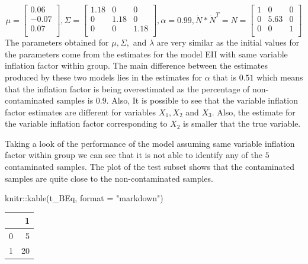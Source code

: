 \documentclass[
]{article}
\newenvironment{Shaded}{\begin{snugshade}}{\end{snugshade}}
\newcommand{\AttributeTok}[1]{\textcolor[rgb]{0.77,0.63,0.00}{#1}}
\newcommand{\FunctionTok}[1]{\textcolor[rgb]{0.00,0.00,0.00}{#1}}
\newcommand{\NormalTok}[1]{#1}
\newcommand{\SpecialCharTok}[1]{\textcolor[rgb]{0.00,0.00,0.00}{#1}}
\newcommand{\StringTok}[1]{\textcolor[rgb]{0.31,0.60,0.02}{#1}}
\begin{document}
\[
\mu = \begin{bmatrix}0.06 \\-0.07 \\0.07 \\\end{bmatrix} , \Sigma = \begin{bmatrix}1.18&0&0 \\0&1.18&0 \\0&0&1.18 \\\end{bmatrix} , \alpha = 0.99, \dot{N} * \dot{N}^{T} = N = \begin{bmatrix}1&0&0 \\0&5.63&0 \\0&0&1 \\\end{bmatrix}
\] The parameters obtained for \(\mu,\Sigma,\) and \(\lambda\) are very
similar as the initial values for the parameters come from the estimates
for the model EII with same variable inflation factor within group. The
main difference between the estimates produced by these two models lies
in the estimates for \(\alpha\) that is \(0.51\) which means that the
inflation factor is being overestimated as the percentage of
non-contaminated samples is \(0.9\). Also, It is possible to see that
the variable inflation factor estimates are different for variables
\(X_{1},X_{2}\) and \(X_{3}\). Also, the estimate for the variable
inflation factor corresponding to \(X_{2}\) is smaller that the true
variable.

Taking a look of the performance of the model assuming same variable
inflation factor within group we can see that it is not able to identify
any of the \(5\) contaminated samples. The plot of the test subset shows
that the contaminated samples are quite close to the non-contaminated
samples.

\begin{Shaded}
\begin{Highlighting}[]
\NormalTok{knitr}\SpecialCharTok{::}\FunctionTok{kable}\NormalTok{(t\_BEq, }\AttributeTok{format =} \StringTok{"markdown"}\NormalTok{)}
\end{Highlighting}
\end{Shaded}

\begin{longtable}[]{@{}lr@{}}
\toprule()
& 1 \\
\midrule()
\endhead
0 & 5 \\
1 & 20 \\
\bottomrule()
\end{longtable}
\end{document}
